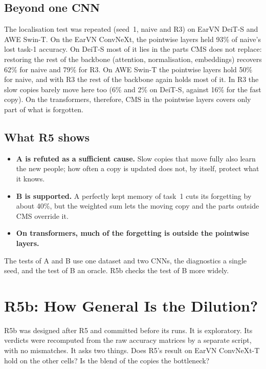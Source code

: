 \documentclass[12pt,a4paper]{report}
\begin{document}
\subsection{Beyond one CNN}
The localisation test was repeated (seed~1, naive and R3) on EarVN DeiT-S and AWE Swin-T. On the EarVN ConvNeXt, the pointwise layers held 93\% of naive's lost task-1 accuracy. On DeiT-S most of it lies in the parts CMS does not replace: restoring the rest of the backbone (attention, normalisation, embeddings) recovers 62\% for naive and 79\% for R3. On AWE Swin-T the pointwise layers hold 50\% for naive, and with R3 the rest of the backbone again holds most of it. In R3 the slow copies barely move here too (6\% and 2\% on DeiT-S, against 16\% for the fast copy). On the transformers, therefore, CMS in the pointwise layers covers only part of what is forgotten.

\subsection{What R5 shows}
\begin{itemize}
\item \textbf{A is refuted as a sufficient cause.} Slow copies that move fully also learn the new people; how often a copy is updated does not, by itself, protect what it knows.
\item \textbf{B is supported.} A perfectly kept memory of task~1 cuts its forgetting by about 40\%, but the weighted sum lets the moving copy and the parts outside CMS override it.
\item \textbf{On transformers, much of the forgetting is outside the pointwise layers.}
\end{itemize}
The tests of A and B use one dataset and two CNNs, the diagnostics a single seed, and the test of B an oracle. R5b checks the test of B more widely.

\section{R5b: How General Is the Dilution?}\label{sec:r5b}
R5b was designed after R5 and committed before its runs. It is exploratory. Its verdicts were recomputed from the raw accuracy matrices by a separate script, with no mismatches. It asks two things. Does R5's result on EarVN ConvNeXt-T hold on the other cells? Is the blend of the copies the bottleneck?
\end{document}
